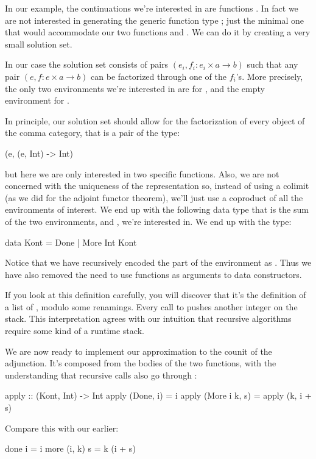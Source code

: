 \documentclass[DaoFP]{subfiles}
\begin{document}
In our example, the continuations we're interested in are functions . In fact we are not interested in generating the generic function type ; just the minimal one that would accommodate our two functions  and . We can do it by creating a very small solution set. 

In our case the solution set consists of pairs $(e_i, f_i \colon e_i \times a \to b)$ such that any pair $(e, f \colon e \times a \to b)$ can be factorized through one of the $f_i$'s. More precisely, the only two environments we're interested in are  for , and the empty environment \hask{()} for . 

In principle, our solution set should allow for the factorization of every object of the comma category, that is a pair of the type:
\begin{haskell}
(e, (e, Int) -> Int)
\end{haskell}
but here we are only interested in two specific functions. Also, we are not concerned with the uniqueness of the representation so, instead of using a colimit (as we did for the adjoint functor theorem), we'll just use a coproduct of all the environments of interest. We end up with the following data type that is the sum of the two environments, \hask{()} and , we're interested in. We end up with the type:
\begin{haskell}
data Kont = Done | More Int Kont
\end{haskell}
Notice that we have recursively encoded the  part of the environment as . Thus we have also removed the need to use functions as arguments to data constructors.

If you look at this definition carefully, you will discover that it's the definition of a list of , modulo some renamings. Every call to  pushes another integer on the  stack. This interpretation agrees with our intuition that recursive algorithms require some kind of a runtime stack. 

We are now ready to implement our approximation to the counit of the adjunction. It's composed from the bodies of the two functions, with the understanding that recursive calls also go through :
\begin{haskell}
apply :: (Kont, Int) -> Int
apply (Done, i) = i
apply (More i k, s) = apply (k, i + s)
\end{haskell}
Compare this with our earlier:
\begin{haskell}
done i = i
more (i, k) s = k (i + s)
\end{haskell}
\end{document}
